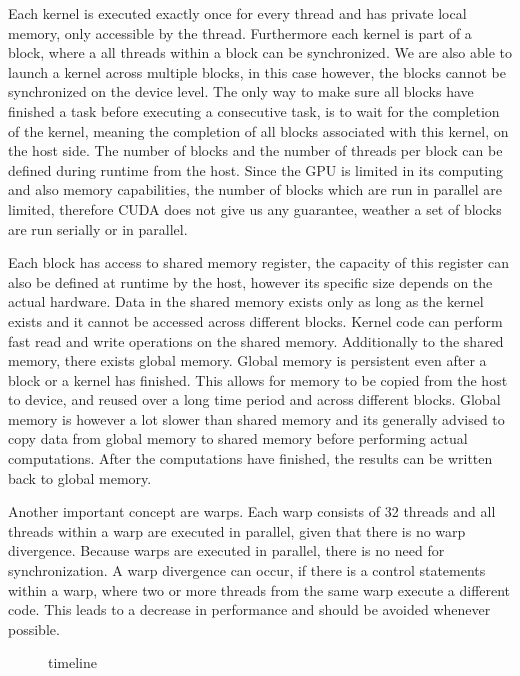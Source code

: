 \documentclass[]{article}
\begin{document}
Each kernel is executed exactly once for every thread and has private local memory, only accessible by the thread. Furthermore each kernel is part of a block, where a all threads within a block can be synchronized. We are also able to launch a kernel across multiple blocks, in this case however, the blocks cannot be synchronized on the device level. The only way to make sure all blocks have finished a task before executing a consecutive task, is to wait for the completion of the kernel, meaning the completion of all blocks associated with this kernel, on the host side. The number of blocks and the number of threads per block can be defined during runtime from the host. Since the GPU is limited in its computing and also memory capabilities, the number of blocks which are run in parallel are limited, therefore CUDA does not give us any guarantee, weather a set of blocks are run serially or in parallel.  

Each block has access to shared memory register, the capacity of this register can also be defined at runtime by the host, however its specific size depends on the actual hardware. Data in the shared memory exists only as long as the kernel exists and it cannot be accessed across different blocks. Kernel code can perform fast read and write operations on the shared memory. Additionally to the shared memory, there exists global memory. Global memory is persistent even after a block or a kernel has finished. This allows for memory to be copied from the host to device, and reused over a long time period and across different blocks. Global memory is however a lot slower than shared memory and its generally advised to copy data from global memory to shared memory before performing actual computations. After the computations have finished, the results can be written back to global memory.

Another important concept are warps. Each warp consists of 32 threads and all threads within a warp are executed in parallel, given that there is no warp divergence. Because warps are executed in parallel, there is no need for synchronization. A warp divergence can occur, if there is a control statements within a warp, where two or more threads from the same warp execute a different code. This leads to a decrease in performance and should be avoided whenever possible.

\begin{figure}
	\begin{center}
	\end{center}
	\caption{timeline}
	\label{u}
\end{figure}
\end{document}
